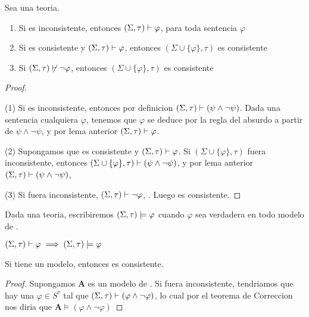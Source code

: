 \begin{lemma}
  Sea \forder una teoria. \begin{enumerate}
    \item Si \forder es inconsistente, entonces $(\Sigma,\tau)\vdash\varphi$, para toda sentencia $\varphi$
    \item Si \forder es consistente y $(\Sigma,\tau)\vdash\varphi$, entonces $(\Sigma\cup\{\varphi\},\tau)$ es consistente
    \item Si $(\Sigma,\tau)\not\vdash\neg\varphi$, entonces $(\Sigma\cup\{\varphi\},\tau)$ es consistente
  \end{enumerate}
\end{lemma}
\begin{proof}
  $ $

  (1) Si \forder es inconsistente, entonces por definicion $(\Sigma,\tau)\vdash(\psi\land\neg\psi)$. Dada una sentencia cualquiera 
  $\varphi$, tenemos que $\varphi$ se deduce por la regla del absurdo a partir de $\psi\land\neg\psi$, y por lema anterior $(\Sigma,\tau)\vdash\varphi$.

  (2) Supongamos que \forder es consistente y $(\Sigma,\tau)\vdash\varphi$. Si $(\Sigma\cup\{\varphi\},\tau)$ fuera inconsistente,
  entonces $(\Sigma\cup\{\varphi\},\tau)\vdash(\psi\land\neg\psi)$, y por lema anterior $(\Sigma,\tau)\vdash(\psi\land\neg\psi)$, \abs

  (3) Si \forder fuera inconsistente, $(\Sigma,\tau)\vdash\neg\varphi$, \abs. Luego \forder es consistente.
\end{proof}

\begin{definition}
  Dada \forder una teoria, escribiremos $(\Sigma,\tau)\models\varphi$ cuando $\varphi$ sea verdadera en todo modelo de \forder.
\end{definition}

\begin{theorem}
  $(\Sigma,\tau)\vdash\varphi \implies (\Sigma,\tau)\models\varphi$
\end{theorem}
\noproof
\begin{corollary}
  Si \forder tiene un modelo, entonces \forder es consistente.
\end{corollary}
\begin{proof}
  Supongamos $\mathbf{A}$ es un modelo de \forder. Si \forder fuera inconsistente, tendriamos que hay una $\varphi\in S^\tau$
  tal que $(\Sigma,\tau)\vdash(\varphi\land\neg\varphi)$, lo cual por el teorema de Correccion nos diria que $\mathbf{A}\models(\varphi\land\neg\varphi)$
\end{proof}

